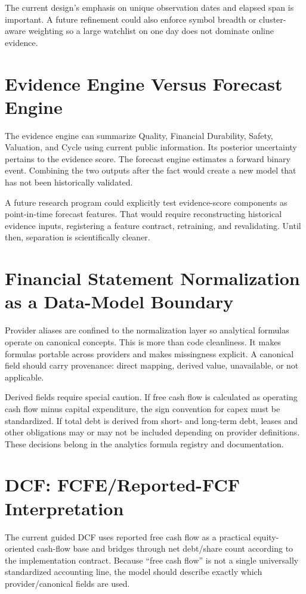 \documentclass[11pt]{article}
\begin{document}
The current design's emphasis on unique observation dates and elapsed span is important. A future refinement could also enforce symbol breadth or cluster-aware weighting so a large watchlist on one day does not dominate online evidence.

\section{Evidence Engine Versus Forecast Engine}
The evidence engine can summarize Quality, Financial Durability, Safety, Valuation, and Cycle using current public information. Its posterior uncertainty pertains to the evidence score. The forecast engine estimates a forward binary event. Combining the two outputs after the fact would create a new model that has not been historically validated.

A future research program could explicitly test evidence-score components as point-in-time forecast features. That would require reconstructing historical evidence inputs, registering a feature contract, retraining, and revalidating. Until then, separation is scientifically cleaner.

\section{Financial Statement Normalization as a Data-Model Boundary}
Provider aliases are confined to the normalization layer so analytical formulas operate on canonical concepts. This is more than code cleanliness. It makes formulas portable across providers and makes missingness explicit. A canonical field should carry provenance: direct mapping, derived value, unavailable, or not applicable.

Derived fields require special caution. If free cash flow is calculated as operating cash flow minus capital expenditure, the sign convention for capex must be standardized. If total debt is derived from short- and long-term debt, leases and other obligations may or may not be included depending on provider definitions. These decisions belong in the analytics formula registry and documentation.

\section{DCF: FCFE/Reported-FCF Interpretation}
The current guided DCF uses reported free cash flow as a practical equity-oriented cash-flow base and bridges through net debt/share count according to the implementation contract. Because ``free cash flow'' is not a single universally standardized accounting line, the model should describe exactly which provider/canonical fields are used.
\end{document}
